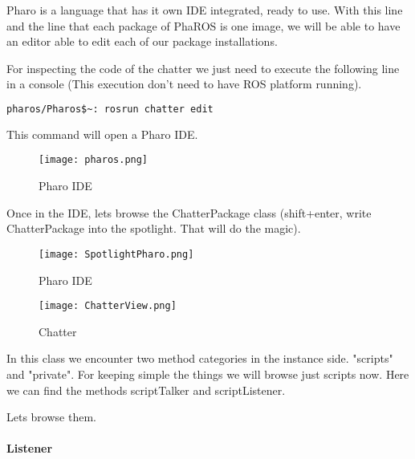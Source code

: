 \documentclass[a4paper,10pt,twoside]{book}
\begin{document}
			Pharo is a language that has it own IDE integrated, ready to use. With this line and the line that each package of PhaROS is one image, we will be able to have an editor able to edit each of our package installations. 
			
			For inspecting the code of the chatter we just need to execute the following line in a console (This execution don't need to have ROS platform running).
			
			\begin{lstlisting}[language=bash,title={Editing}]
				pharos/Pharos$~: rosrun chatter edit
			\end{lstlisting}
			 
			
			This command will open a Pharo IDE. 
			
			\begin{figure}[!htbp]
  				\centering
    				\texttt{[image: pharos.png]}
				\caption{Pharo IDE}
				\centering
			\end{figure}
			
			
			\newpage
			
			
			
			Once in the IDE, lets browse the ChatterPackage class (shift+enter, write ChatterPackage into the spotlight. That will do the magic).
			
			\begin{figure}[!htbp]
  				\centering
    				\texttt{[image: SpotlightPharo.png]}
				\caption{Pharo IDE \label{img:spotlight} }
				\centering
			\end{figure}
			
						
			
			
			\newpage	
			
			\begin{figure}[!htbp]
  				\centering
    				\texttt{[image: ChatterView.png]}
				\caption{Chatter}
				\centering
			\end{figure}

			
			In this class we encounter two method categories in the instance side. "scripts" and "private". For keeping simple the things we will browse just scripts now.
			Here we can find the methods scriptTalker and scriptListener. 
			
			\newpage
			
			Lets browse them.
			
			\paragraph{Listener\newline\newline}
			
\end{document}
